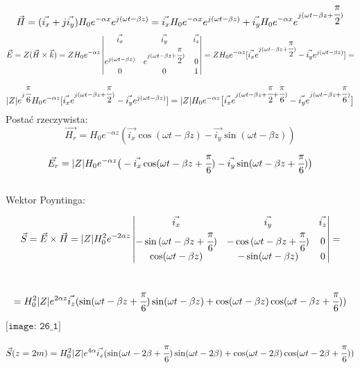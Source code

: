 \begin{solution}
$$ \vec{H} = (\vec{i_{x}} + j\vec{i_{y}})H_{0}e^{-\alpha x}e^{j(\omega t - \beta z)} = \vec{i_{x}}H_{0}e^{-\alpha x}e^{j(\omega t - \beta z)} + \vec{i_{y}}H_{0}e^{-\alpha x }e^{j(\omega t - \beta z + \cfrac{\pi}{2})} $$
$$\vec{E}=Z(\vec{H}\times\vec{k})=ZH_{0}e^{-\alpha z} \begin{vmatrix}
					\vec{i_{x}}&\vec{i_{y}}&\vec{i_{z}}\\
					e^{j(\omega t-\beta z)}&e^{j(\omega t-\beta z+\cfrac{\pi}{2})}&0\\
					0&0&1\end{vmatrix}
					=ZH_{0}e^{-\alpha z}[\vec{i_{x}}e^{j(\omega t - \beta z + \cfrac{\pi}{2})} - 
							\vec{i_{y}}e^{j(\omega t - \beta z)}]=$$ $$
					|Z|e^{j\cfrac{\pi}{6}}H_{0}e^{-\alpha z}[\vec{i_{x}}e^{j(\omega t - \beta z + \cfrac{\pi}{2})} - 
							\vec{i_{y}}e^{j(\omega t - \beta z)}]
					=|Z|H_{0}e^{-\alpha z}\big{[}\vec{i_{x}}e^{j(\omega t - \beta z + \cfrac{\pi}{2} + 
					\cfrac{\pi}{6})} - \vec{i_{y}}e^{j(\omega t - \beta z + \cfrac{\pi}{6})}\big{]}$$
Postać rzeczywista:
$$\vec{H_{r}}=H_{0}e^{- \alpha z}(\vec{i_{x}}\cos(\omega t - \beta z) - \vec{i_{y}}
				\sin(\omega t - \beta z)) $$
$$\vec{E_{r}}=|Z|H_{0}e^{- \alpha z}\big{(}-\vec{i_{x}}\cos(\omega t - \beta z + 
					\cfrac{\pi}{6}) - \vec{i_{y}}\sin(\omega t - \beta z + \cfrac{\pi}{6})\big{)} $$\\
Wektor Poyntinga:

$$\vec{S}=\vec{E}\times\vec{H}=|Z|H_{0}^{2}e^{-2\alpha z}\begin{vmatrix}
					\vec{i_{x}}&\vec{i_{y}}&\vec{i_{z}}\\
					-\sin{(\omega t-\beta z+\cfrac{\pi}{6})}&-\cos{(\omega t-\beta z+\cfrac{\pi}{6})}&0\\
					\cos(\omega t - \beta z)&-\sin(\omega t - \beta z)&0\end{vmatrix}=$$\\
					$$=H_{0}^{2}|Z|e^{2\alpha z}\vec{i_{z}}(\sin(\omega t - \beta z + \cfrac{\pi}{6})\sin(\omega t - \beta z) + \cos(\omega t - \beta z)\cos(\omega t - \beta z + \cfrac{\pi}{6}) )$$

\begin{center}
$\texttt{[image: 26\_1]}$\\
\end{center}

$$\vec{S}(z=2m)=H_{0}^{2}|Z|e^{4\alpha}\vec{i_{z}}(\sin(\omega t - 2\beta + \cfrac{\pi}{6})\sin(\omega t - 2\beta) + \cos(\omega t - 2\beta)\cos(\omega t - 2\beta + \cfrac{\pi}{6}) )$$

\end{solution}

